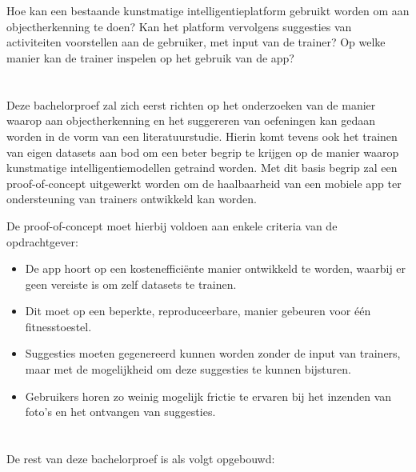 \section{}
\label{sec:onderzoeksvraag}
Hoe kan een bestaande kunstmatige intelligentieplatform gebruikt worden om aan objectherkenning te doen?
Kan het platform vervolgens suggesties van activiteiten voorstellen aan de gebruiker, met input van de trainer?
Op welke manier kan de trainer inspelen op het gebruik van de app?

\section{}
\label{sec:onderzoeksdoelstelling}
Deze bachelorproef zal zich eerst richten op het onderzoeken van de manier waarop aan objectherkenning en het suggereren van oefeningen kan gedaan worden in de vorm van een literatuurstudie.
Hierin komt tevens ook het trainen van eigen datasets aan bod om een beter begrip te krijgen op de manier waarop kunstmatige intelligentiemodellen getraind worden.
Met dit basis begrip zal een proof-of-concept uitgewerkt worden om de haalbaarheid van een mobiele app ter ondersteuning van trainers ontwikkeld kan worden.

De proof-of-concept moet hierbij voldoen aan enkele criteria van de opdrachtgever:
\begin{itemize}
    \item De app hoort op een kosteneffici\"ente manier ontwikkeld te worden, waarbij er geen vereiste is om zelf datasets te trainen.
    \item Dit moet op een beperkte, reproduceerbare, manier gebeuren voor \'e\'en fitnesstoestel.
    \item Suggesties moeten gegenereerd kunnen worden zonder de input van trainers, maar met de mogelijkheid om deze suggesties te kunnen bijsturen.
    \item Gebruikers horen zo weinig mogelijk frictie te ervaren bij het inzenden van foto's en het ontvangen van suggesties.
\end{itemize}

\section{}
\label{sec:opzet-bachelorproef}
De rest van deze bachelorproef is als volgt opgebouwd:

